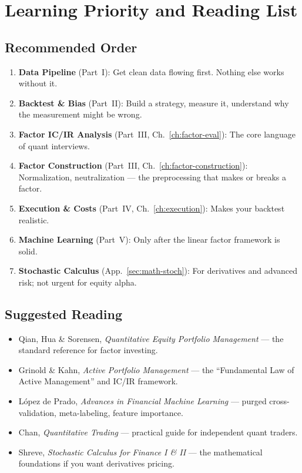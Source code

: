 \documentclass[a4paper, 11pt]{report}
\theoremstyle{definition}
\theoremstyle{remark}
\begin{document}
\chapter{Learning Priority and Reading List}
\label{app:priority}

\section{Recommended Order}

\begin{enumerate}
    \item \textbf{Data Pipeline} (Part~I): Get clean data flowing first.
          Nothing else works without it.
    \item \textbf{Backtest \& Bias} (Part~II): Build a strategy, measure it,
          understand why the measurement might be wrong.
    \item \textbf{Factor IC/IR Analysis} (Part~III, Ch.~\ref{ch:factor-eval}):
          The core language of quant interviews.
    \item \textbf{Factor Construction} (Part~III, Ch.~\ref{ch:factor-construction}):
          Normalization, neutralization --- the preprocessing that makes or
          breaks a factor.
    \item \textbf{Execution \& Costs} (Part~IV, Ch.~\ref{ch:execution}):
          Makes your backtest realistic.
    \item \textbf{Machine Learning} (Part~V): Only after the linear factor
          framework is solid.
    \item \textbf{Stochastic Calculus} (App.~\ref{sec:math-stoch}): For
          derivatives and advanced risk; not urgent for equity alpha.
\end{enumerate}

\section{Suggested Reading}

\begin{itemize}
    \item Qian, Hua \& Sorensen, \textit{Quantitative Equity Portfolio
          Management} --- the standard reference for factor investing.
    \item Grinold \& Kahn, \textit{Active Portfolio Management} --- the
          ``Fundamental Law of Active Management'' and IC/IR framework.
    \item L\'{o}pez de Prado, \textit{Advances in Financial Machine Learning}
          --- purged cross-validation, meta-labeling, feature importance.
    \item Chan, \textit{Quantitative Trading} --- practical guide for
          independent quant traders.
    \item Shreve, \textit{Stochastic Calculus for Finance I \& II} --- the
          mathematical foundations if you want derivatives pricing.
\end{itemize}
\end{document}
